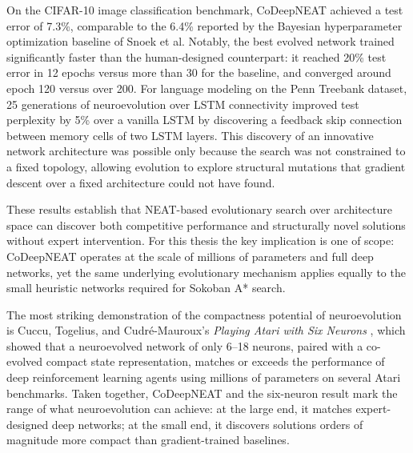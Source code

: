 On the CIFAR-10 image classification benchmark, CoDeepNEAT achieved a test error of 7.3\%, comparable to the 6.4\% reported by the Bayesian hyperparameter optimization baseline of Snoek et al. Notably, the best evolved network trained significantly faster than the human-designed counterpart: it reached 20\% test error in 12 epochs versus more than 30 for the baseline, and converged around epoch 120 versus over 200. For language modeling on the Penn Treebank dataset, 25 generations of neuroevolution over LSTM connectivity improved test perplexity by 5\% over a vanilla LSTM by discovering a feedback skip connection between memory cells of two LSTM layers. This discovery of an innovative network architecture was possible only because the search was not constrained to a fixed topology, allowing evolution to explore structural mutations that gradient descent over a fixed architecture could not have found.

These results establish that NEAT-based evolutionary search over architecture space can discover both competitive performance and structurally novel solutions without expert intervention. For this thesis the key implication is one of scope: CoDeepNEAT operates at the scale of millions of parameters and full deep networks, yet the same underlying evolutionary mechanism applies equally to the small heuristic networks required for Sokoban A* search.

The most striking demonstration of the compactness potential of neuroevolution is Cuccu, Togelius, and Cudr\'{e}-Mauroux's \textit{Playing Atari with Six Neurons} \cite{cuccu2019playing}, which showed that a neuroevolved network of only 6--18 neurons, paired with a co-evolved compact state representation, matches or exceeds the performance of deep reinforcement learning agents using millions of parameters on several Atari benchmarks. Taken together, CoDeepNEAT and the six-neuron result mark the range of what neuroevolution can achieve: at the large end, it matches expert-designed deep networks; at the small end, it discovers solutions orders of magnitude more compact than gradient-trained baselines.
